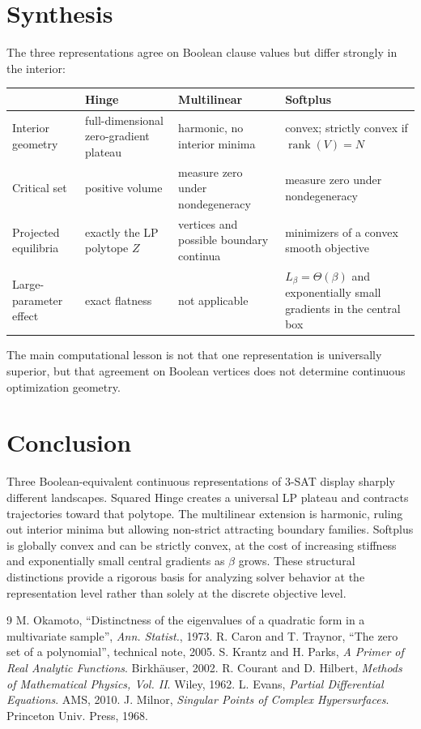 \documentclass[11pt,a4paper]{article}
\begin{document}
\section{Synthesis}
The three representations agree on Boolean clause values but differ strongly in the interior:
\begin{center}
\begin{tabularx}{\textwidth}{@{}lXXX@{}}
\toprule
 & Hinge & Multilinear & Softplus\\
\midrule
Interior geometry & full-dimensional zero-gradient plateau & harmonic, no interior minima & convex; strictly convex if $\operatorname{rank}(V)=N$\\
Critical set & positive volume & measure zero under nondegeneracy & measure zero under nondegeneracy\\
Projected equilibria & exactly the LP polytope $Z$ & vertices and possible boundary continua & minimizers of a convex smooth objective\\
Large-parameter effect & exact flatness & not applicable & $L_\beta=\Theta(\beta)$ and exponentially small gradients in the central box\\
\bottomrule
\end{tabularx}
\end{center}

The main computational lesson is not that one representation is universally superior, but that agreement on Boolean vertices does not determine continuous optimization geometry.

\section{Conclusion}
Three Boolean-equivalent continuous representations of 3-SAT display sharply different landscapes. Squared Hinge creates a universal LP plateau and contracts trajectories toward that polytope. The multilinear extension is harmonic, ruling out interior minima but allowing non-strict attracting boundary families. Softplus is globally convex and can be strictly convex, at the cost of increasing stiffness and exponentially small central gradients as $\beta$ grows. These structural distinctions provide a rigorous basis for analyzing solver behavior at the representation level rather than solely at the discrete objective level.

\begin{thebibliography}{9}
 M. Okamoto, ``Distinctness of the eigenvalues of a quadratic form in a multivariate sample'', \emph{Ann. Statist.}, 1973.
 R. Caron and T. Traynor, ``The zero set of a polynomial'', technical note, 2005.
 S. Krantz and H. Parks, \emph{A Primer of Real Analytic Functions}. Birkh\"auser, 2002.
 R. Courant and D. Hilbert, \emph{Methods of Mathematical Physics, Vol. II}. Wiley, 1962.
 L. Evans, \emph{Partial Differential Equations}. AMS, 2010.
 J. Milnor, \emph{Singular Points of Complex Hypersurfaces}. Princeton Univ. Press, 1968.
\end{thebibliography}
\end{document}

